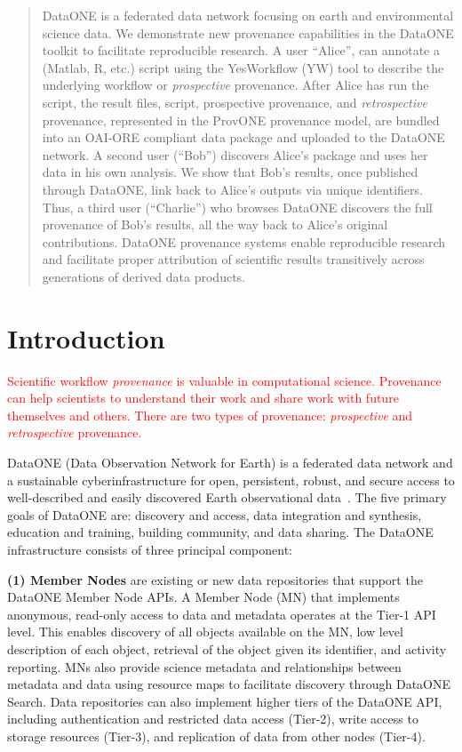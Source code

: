 \documentclass[a4paper]{llncs}
\newcommand{\mypara}[1]{\vspace{4pt}\noindent\textbf{#1}}
\begin{document}
\begin{abstract}
  DataONE is a federated data network focusing on earth and environmental science data.  We demonstrate new provenance capabilities in the DataONE toolkit to facilitate reproducible research. A user ``Alice'', can annotate a (Matlab, R, etc.) script using the YesWorkflow (YW) tool to describe the underlying workflow or \emph{prospective} provenance. After Alice has run the script, the result files, script, prospective provenance, and \emph{retrospective} provenance, represented in the ProvONE provenance model, are bundled into an OAI-ORE compliant data package and uploaded to the DataONE network. A second user (``Bob'') discovers Alice's package and uses her data in his own analysis. We show that Bob's results, once published through DataONE, link back to Alice's outputs via unique identifiers. Thus, a third user (``Charlie'') who browses DataONE discovers the full provenance of Bob's results, all the way back to Alice's original contributions.  DataONE provenance systems enable reproducible research and facilitate proper attribution of scientific results transitively across generations of derived data products.  \end{abstract}




\section{Introduction}

\textcolor{red}{Scientific workflow \emph{provenance} is valuable in computational science. Provenance can help scientists to understand their work and share work with future themselves and others. There are two types of provenance: \emph{prospective} and \emph{retrospective} provenance. }

DataONE (Data Observation Network for Earth) is a federated data network and a sustainable cyberinfrastructure for open, persistent, robust, and secure access to well-described and easily discovered Earth observational data~\cite{dataone}. The five primary goals of DataONE are: discovery and access, data integration and synthesis, education and training, building community, and data sharing. The DataONE infrastructure consists of three principal component:


\mypara{(1) Member Nodes} are existing or new data repositories that support the DataONE Member Node APIs.  A Member Node (MN) that implements anonymous, read-only access to data and metadata operates at the Tier-1 API level. This enables discovery of all objects available on the MN, low level description of each object, retrieval of the object given its identifier, and activity reporting. MNs also provide science metadata and relationships between metadata and data using resource maps \cite{oaiore} to facilitate discovery through DataONE Search.  Data repositories can also implement higher tiers of the DataONE API, including authentication and restricted data access (Tier-2), write access to storage resources (Tier-3), and replication of data from other nodes
(Tier-4).
\end{document}
